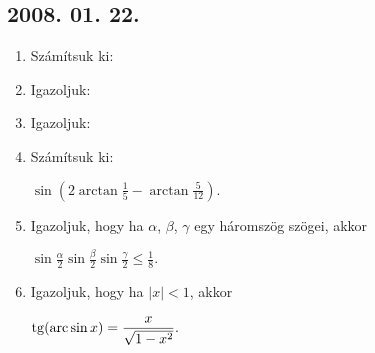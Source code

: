 \subsection*{2008. 01. 22.}
\begin{enumerate}
\item Számítsuk ki:
\item Igazoljuk:
\item Igazoljuk:
\item Számítsuk ki:

$\displaystyle\sin\left(2\arctan\frac{1}{5}-\arctan\frac{5}{12}\right).$
\item Igazoljuk, hogy ha $\alpha$, $\beta$, $\gamma$ egy háromszög szögei, akkor

$\displaystyle\sin\frac{\alpha}{2}\sin\frac{\beta}{2}\sin\frac{\gamma}{2}\leq\frac{1}{8}.$
 \item Igazoljuk, hogy ha $|x|<1$, akkor
 
$\displaystyle\mathop{\mathrm{tg}}\nolimits(\mathop{\mathrm{arc}}\nolimits\sin x)=\frac{x}{\sqrt{1-x^2}}.$
\end{enumerate}

